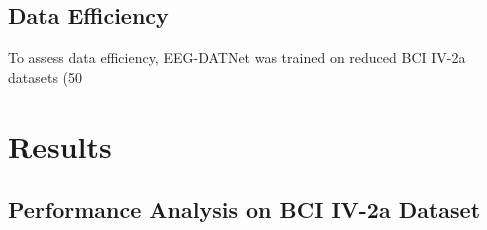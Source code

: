 \documentclass[pdflatex,sn-mathphys-num]{sn-jnl}%
\theoremstyle{thmstyleone}
\theoremstyle{thmstyletwo}
\theoremstyle{thmstylethree}
\begin{document}
\subsection{Data Efficiency}\label{subsec:data_eff}
To assess data efficiency, EEG-DATNet was trained on reduced BCI IV-2a datasets (50%

\section{Results}

\subsection{Performance Analysis on BCI IV-2a Dataset}
\end{document}
